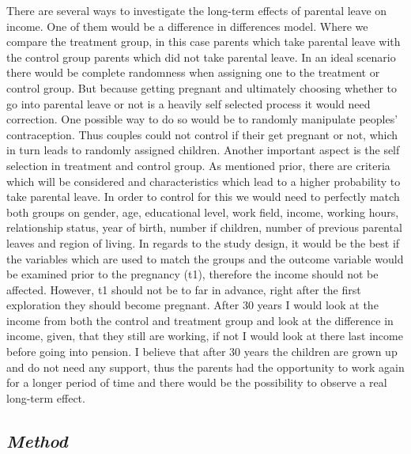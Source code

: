 \documentclass[
  12pt,
]{article}
\begin{document}
There are several ways to investigate the long-term effects of parental leave on income. One of them would be a difference in differences model. Where we compare the treatment group, in this case parents which take parental leave with the control group parents which did not take parental leave. In an ideal scenario there would be complete randomness when assigning one to the treatment or control group. But because getting pregnant and ultimately choosing whether to go into parental leave or not is a heavily self selected process it would need correction. One possible way to do so would be to randomly manipulate peoples' contraception. Thus couples could not control if their get pregnant or not, which in turn leads to randomly assigned children. Another important aspect is the self selection in treatment and control group. As mentioned prior, there are criteria which will be considered and characteristics which lead to a higher probability to take parental leave. In order to control for this we would need to perfectly match both groups on gender, age, educational level, work field, income, working hours, relationship status, year of birth, number if children, number of previous parental leaves and region of living.
In regards to the study design, it would be the best if the variables which are used to match the groups and the outcome variable would be examined prior to the pregnancy (t1), therefore the income should not be affected. However, t1 should not be to far in advance, right after the first exploration they should become pregnant. After 30 years I would look at the income from both the control and treatment group and look at the difference in income, given, that they still are working, if not I would look at there last income before going into pension. I believe that after 30 years the children are grown up and do not need any support, thus the parents had the opportunity to work again for a longer period of time and there would be the possibility to observe a real long-term effect.

\hypertarget{method}{%
\subsection*{\texorpdfstring{\emph{Method}}{Method}}\label{method}}
\end{document}

